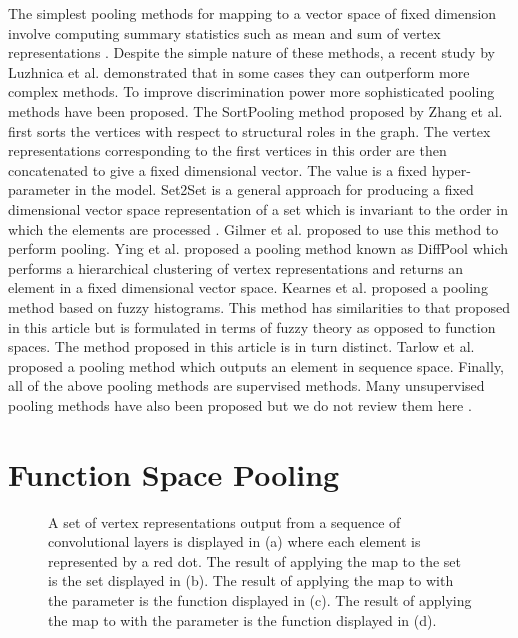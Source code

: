 \documentclass[runningheads]{llncs}
\begin{document}
The simplest pooling methods for mapping to a vector space of fixed dimension involve computing summary statistics such as mean and sum of vertex representations \cite{duvenaud2015}. Despite the simple nature of these methods, a recent study by Luzhnica et al. \cite{luzhnica2019graph} demonstrated that in some cases they can outperform more complex methods. To improve discrimination power more sophisticated pooling methods have been proposed. The SortPooling method proposed by Zhang et al. \cite{zhang2018} first sorts the vertices with respect to structural roles in the graph. The vertex representations corresponding to the first  vertices in this order are then concatenated to give a fixed dimensional vector. The value  is a fixed hyper-parameter in the model. Set2Set is a general approach for producing a fixed dimensional vector space representation of a set which is invariant to the order in which the elements are processed \cite{vinyals2015}. Gilmer et al. \cite{gilmer2017} proposed to use this method to perform pooling. Ying et al. \cite{ying2018} proposed a pooling method known as DiffPool which performs a hierarchical clustering of vertex representations and returns an element in a fixed dimensional vector space. Kearnes et al. \cite{kearnes2016} proposed a pooling method based on fuzzy histograms. This method has similarities to that proposed in this article but is formulated in terms of fuzzy theory as opposed to function spaces. The method proposed in this article is in turn distinct. Tarlow et al. \cite{li2015gated} proposed a pooling method which outputs an element in sequence space. Finally, all of the above pooling methods are supervised methods. Many unsupervised pooling methods have also been proposed but we do not review them here \cite{bai2019}.

\section{Function Space Pooling}
\label{sec:function_space_pooling} 

\begin{figure*}
\begin{center}
\hspace{0.0cm}
\hspace{0.0cm}
\hspace{0.0cm}
\caption{A set  of vertex representations output from a sequence of convolutional layers is displayed in (a) where each element is represented by a red dot. The result of applying the map  to the set  is the set  displayed in (b). The result of applying the map  to  with the parameter  is the function  displayed in (c). The result of applying the map  to  with the parameter  is the function  displayed in (d).}
\label{fig:evolving_spatial}
\end{center}
\end{figure*}
\end{document}
